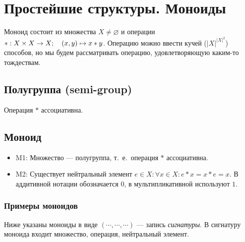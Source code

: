 \documentclass[a4paper]{report}
\begin{document}
    \section{Простейшие структуры. Моноиды}

    Моноид состоит из множества $X \ne \varnothing$ и операции $* : X \times X \rightarrow X;\quad (x, y) \mapsto x * y$.
    Операцию можно ввести кучей ($|X|^{|X|^2}$) способов, но мы будем рассматривать операцию, удовлетворяющую каким-то тождествам.

    \subsection{Полугруппа (semi-group)}

    Операция $*$ ассоциативна.

    \subsection{Моноид}
    \begin{itemize}
        \item M1: Множество --- полугруппа, т.\ е.\ операция $*$ ассоциативна.
        \item M2: Существует нейтральный элемент $e \in X: \forall x \in X : e * x = x * e = x$.
        В аддитивной нотации обозначается $0$, в мультипликативной используют $1$.

    \end{itemize}

    \subsubsection{Примеры моноидов}
    Ниже указаны моноиды в виде $(\cdots, \cdots, \cdots)$ --- запись \emph{сигнатуры}.
    В сигнатуру моноида входит множество, операция, нейтральный элемент.
\end{document}
